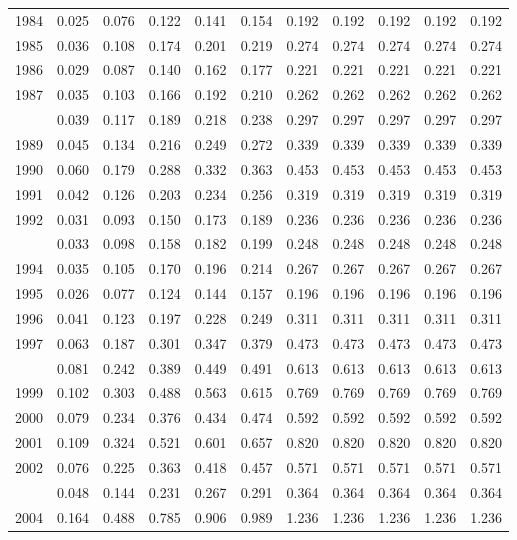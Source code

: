 \documentclass[
]{article}
\begin{document}
\begin{longtable}[t]{lrrrrrrrrrr}
1984 & 0.025 & 0.076 & 0.122 & 0.141 & 0.154 & 0.192 & 0.192 & 0.192 & 0.192 & 0.192\\
1985 & 0.036 & 0.108 & 0.174 & 0.201 & 0.219 & 0.274 & 0.274 & 0.274 & 0.274 & 0.274\\
1986 & 0.029 & 0.087 & 0.140 & 0.162 & 0.177 & 0.221 & 0.221 & 0.221 & 0.221 & 0.221\\
1987 & 0.035 & 0.103 & 0.166 & 0.192 & 0.210 & 0.262 & 0.262 & 0.262 & 0.262 & 0.262\\
\addlinespace
1988 & 0.039 & 0.117 & 0.189 & 0.218 & 0.238 & 0.297 & 0.297 & 0.297 & 0.297 & 0.297\\
1989 & 0.045 & 0.134 & 0.216 & 0.249 & 0.272 & 0.339 & 0.339 & 0.339 & 0.339 & 0.339\\
1990 & 0.060 & 0.179 & 0.288 & 0.332 & 0.363 & 0.453 & 0.453 & 0.453 & 0.453 & 0.453\\
1991 & 0.042 & 0.126 & 0.203 & 0.234 & 0.256 & 0.319 & 0.319 & 0.319 & 0.319 & 0.319\\
1992 & 0.031 & 0.093 & 0.150 & 0.173 & 0.189 & 0.236 & 0.236 & 0.236 & 0.236 & 0.236\\
\addlinespace
1993 & 0.033 & 0.098 & 0.158 & 0.182 & 0.199 & 0.248 & 0.248 & 0.248 & 0.248 & 0.248\\
1994 & 0.035 & 0.105 & 0.170 & 0.196 & 0.214 & 0.267 & 0.267 & 0.267 & 0.267 & 0.267\\
1995 & 0.026 & 0.077 & 0.124 & 0.144 & 0.157 & 0.196 & 0.196 & 0.196 & 0.196 & 0.196\\
1996 & 0.041 & 0.123 & 0.197 & 0.228 & 0.249 & 0.311 & 0.311 & 0.311 & 0.311 & 0.311\\
1997 & 0.063 & 0.187 & 0.301 & 0.347 & 0.379 & 0.473 & 0.473 & 0.473 & 0.473 & 0.473\\
\addlinespace
1998 & 0.081 & 0.242 & 0.389 & 0.449 & 0.491 & 0.613 & 0.613 & 0.613 & 0.613 & 0.613\\
1999 & 0.102 & 0.303 & 0.488 & 0.563 & 0.615 & 0.769 & 0.769 & 0.769 & 0.769 & 0.769\\
2000 & 0.079 & 0.234 & 0.376 & 0.434 & 0.474 & 0.592 & 0.592 & 0.592 & 0.592 & 0.592\\
2001 & 0.109 & 0.324 & 0.521 & 0.601 & 0.657 & 0.820 & 0.820 & 0.820 & 0.820 & 0.820\\
2002 & 0.076 & 0.225 & 0.363 & 0.418 & 0.457 & 0.571 & 0.571 & 0.571 & 0.571 & 0.571\\
\addlinespace
2003 & 0.048 & 0.144 & 0.231 & 0.267 & 0.291 & 0.364 & 0.364 & 0.364 & 0.364 & 0.364\\
2004 & 0.164 & 0.488 & 0.785 & 0.906 & 0.989 & 1.236 & 1.236 & 1.236 & 1.236 & 1.236\\

\end{longtable}
\end{document}
